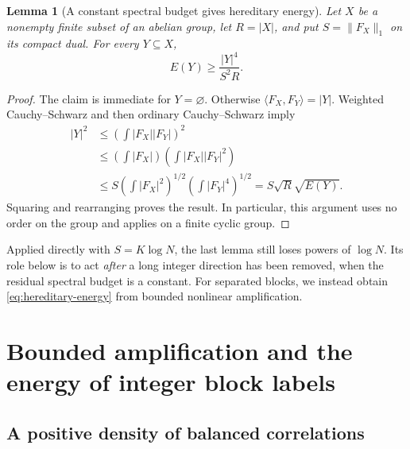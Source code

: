 \documentclass[11pt,reqno]{amsart}
\numberwithin{equation}{section}
\newtheorem{lemma}[theorem]{Lemma}
\theoremstyle{definition}
\theoremstyle{remark}
\newcommand{\norm}[1]{\lVert#1\rVert}
\newcommand{\ip}[2]{\langle#1,#2\rangle}
\begin{document}
\begin{lemma}[A constant spectral budget gives hereditary energy]
\label{lem:spectral-hereditary}
Let $X$ be a nonempty finite subset of an abelian group, let $R=|X|$,
and put $S=\norm{F_X}_1$ on its compact dual. For every $Y\subseteq X$,
\begin{equation}\label{eq:spectral-hereditary}
 E(Y)\ge\frac{|Y|^4}{S^2R}.
\end{equation}
\end{lemma}
\begin{proof}
The claim is immediate for $Y=\varnothing$. Otherwise
$\ip{F_X}{F_Y}=|Y|$. Weighted Cauchy--Schwarz and then ordinary
Cauchy--Schwarz imply
\begin{align*}
 |Y|^2
 &\le\left(\int|F_X||F_Y|\right)^2\\
 &\le\left(\int|F_X|\right)
       \left(\int|F_X||F_Y|^2\right)\\
 &\le S\left(\int|F_X|^2\right)^{1/2}
          \left(\int|F_Y|^4\right)^{1/2}
 =S\sqrt R\sqrt{E(Y)}.
\end{align*}
Squaring and rearranging proves the result. In particular, this argument
uses no order on the group and applies on a finite cyclic group.
\end{proof}

Applied directly with $S=K\log N$, the last lemma still loses powers of
$\log N$. Its role below is to act \emph{after} a long integer direction
has been removed, when the residual spectral budget is a constant.
For separated blocks, we instead obtain \eqref{eq:hereditary-energy}
from bounded nonlinear amplification.

\section{Bounded amplification and the energy of integer block labels}
\label{sec:majority}

\subsection{A positive density of balanced correlations}
\end{document}
